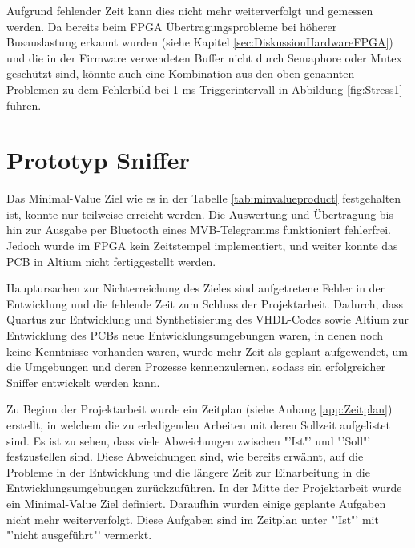 Aufgrund fehlender Zeit kann dies nicht mehr weiterverfolgt und gemessen werden. Da bereits beim FPGA Übertragungsprobleme bei höherer Busauslastung erkannt wurden (siehe Kapitel \ref{sec:DiskussionHardwareFPGA}) und die in der Firmware verwendeten Buffer nicht durch Semaphore oder Mutex geschützt sind, könnte auch eine Kombination aus den oben genannten Problemen zu dem Fehlerbild bei 1 ms Triggerintervall in Abbildung \ref{fig:Stress1} führen.


\section{Prototyp Sniffer}
\label{sec:DiskussionSniffer}
Das Minimal-Value Ziel wie es in der Tabelle \ref{tab:minvalueproduct} festgehalten ist, konnte nur teilweise erreicht werden. Die Auswertung und Übertragung bis hin zur Ausgabe per Bluetooth eines MVB-Telegramms funktioniert fehlerfrei. Jedoch wurde im FPGA kein Zeitstempel implementiert, und weiter konnte das PCB in Altium nicht fertiggestellt werden.

Hauptursachen zur Nichterreichung des Zieles sind aufgetretene Fehler in der Entwicklung und die fehlende Zeit zum Schluss der Projektarbeit. Dadurch, dass Quartus zur Entwicklung und Synthetisierung des VHDL-Codes sowie Altium zur Entwicklung des PCBs neue Entwicklungsumgebungen waren, in denen noch keine Kenntnisse vorhanden waren, wurde mehr Zeit als geplant aufgewendet, um die Umgebungen und deren Prozesse kennenzulernen, sodass ein erfolgreicher Sniffer entwickelt werden kann.


Zu Beginn der Projektarbeit wurde ein Zeitplan (siehe Anhang \ref{app:Zeitplan}) erstellt, in welchem die zu erledigenden Arbeiten mit deren Sollzeit aufgelistet sind. Es ist zu sehen, dass viele Abweichungen zwischen "'Ist"' und "'Soll"' festzustellen sind. Diese Abweichungen sind, wie bereits erwähnt, auf die Probleme in der Entwicklung und die längere Zeit zur Einarbeitung in die Entwicklungsumgebungen zurückzuführen. In der Mitte der Projektarbeit wurde ein Minimal-Value Ziel definiert. Daraufhin wurden einige geplante Aufgaben nicht mehr weiterverfolgt. Diese Aufgaben sind im Zeitplan unter "'Ist"' mit "'nicht ausgeführt"' vermerkt.
